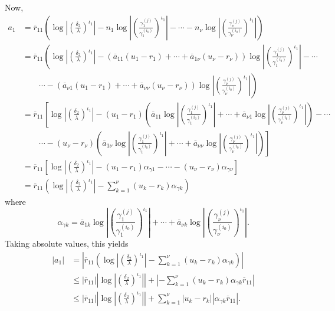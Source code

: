 Now, 
\begin{align*}
a_1	& = \overline{r}_{11}\left(\log\left|\left(\frac{\delta_2}{\lambda}\right)^{\iota_1}\right| - 
	n_1\log\left| \left( \frac{\gamma_1^{(j)}}{\gamma_1^{(i_0)}}\right)^{\iota_1}\right| - \cdots -n_{\nu}\log \left|\left( \frac{\gamma_{\nu}^{(j)}}{\gamma_{\nu}^{(i_0)}}\right)^{\iota_1}\right|\right)\\
	& = \overline{r}_{11}\left(\log\left|\left(\frac{\delta_2}{\lambda}\right)^{\iota_1}\right| - 
	 \left(\overline{a}_{11}(u_1-r_1) + \cdots + \overline{a}_{1\nu}(u_{\nu}-r_{\nu})\right)\log\left| \left( \frac{\gamma_1^{(j)}}{\gamma_1^{(i_0)}}\right)^{\iota_1}\right| - \cdots \right. \\
	 &  \quad \quad \left. \cdots - (\overline{a}_{\nu 1}(u_1-r_1) + \cdots + \overline{a}_{\nu \nu}(u_{\nu}-r_{\nu}))\log \left|\left( \frac{\gamma_{\nu}^{(j)}}{\gamma_{\nu}^{(i_0)}}\right)^{\iota_1}\right|\right)\\
	 & = \overline{r}_{11}\left[\log\left|\left(\frac{\delta_2}{\lambda}\right)^{\iota_1}\right| - (u_1-r_1)\left(\overline{a}_{11}\log\left| \left( \frac{\gamma_1^{(j)}}{\gamma_1^{(i_0)}}\right)^{\iota_1}\right| + \cdots + \overline{a}_{\nu 1}\log\left| \left( \frac{\gamma_{\nu}^{(j)}}{\gamma_{\nu}^{(i_0)}}\right)^{\iota_1}\right|\right) - \cdots\right.\\
	 & \quad \quad \cdots - \left.(u_{\nu}-r_{\nu})\left(\overline{a}_{1\nu}\log\left| \left( \frac{\gamma_1^{(j)}}{\gamma_1^{(i_0)}}\right)^{\iota_1}\right| + \cdots + \overline{a}_{\nu \nu}\log\left| \left( \frac{\gamma_{\nu}^{(j)}}{\gamma_{\nu}^{(i_0)}}\right)^{\iota_1}\right|\right)\right]\\
	 & = \overline{r}_{11}\left[\log\left|\left(\frac{\delta_2}{\lambda}\right)^{\iota_1}\right| - (u_1-r_1)\alpha_{\gamma 1} - \cdots - (u_{\nu} - r_{\nu})\alpha_{\gamma \nu}\right]\\
	 & = \overline{r}_{11}\left(\log\left|\left(\frac{\delta_2}{\lambda}\right)^{\iota_1}\right| - \sum_{k=1}^{\nu}(u_k-r_k)\alpha_{\gamma k}\right)
\end{align*}
where
\[\alpha_{\gamma k} = \overline{a}_{1k}\log\left| \left( \frac{\gamma_1^{(j)}}{\gamma_1^{(i_0)}}\right)^{\iota_1}\right| + \cdots + \overline{a}_{\nu k}\log\left| \left( \frac{\gamma_{\nu}^{(j)}}{\gamma_{\nu}^{(i_0)}}\right)^{\iota_1}\right|.\]
Taking absolute values, this yields
\begin{align*}
|a_1|	& = \left|\overline{r}_{11}\left(\log\left|\left(\frac{\delta_2}{\lambda}\right)^{\iota_1}\right| - \sum_{k=1}^{\nu}(u_k-r_k)\alpha_{\gamma k}\right)\right|\\
	& \leq |\overline{r}_{11}|\left|\log\left|\left(\frac{\delta_2}{\lambda}\right)^{\iota_1}\right|\right| + \left| - \sum_{k=1}^{\nu}(u_k-r_k)\alpha_{\gamma k}\overline{r}_{11}\right|\\
	& \leq |\overline{r}_{11}|\left|\log\left|\left(\frac{\delta_2}{\lambda}\right)^{\iota_1}\right|\right| + \sum_{k=1}^{\nu}|u_k-r_k||\alpha_{\gamma k}\overline{r}_{11}|. 
\end{align*}

